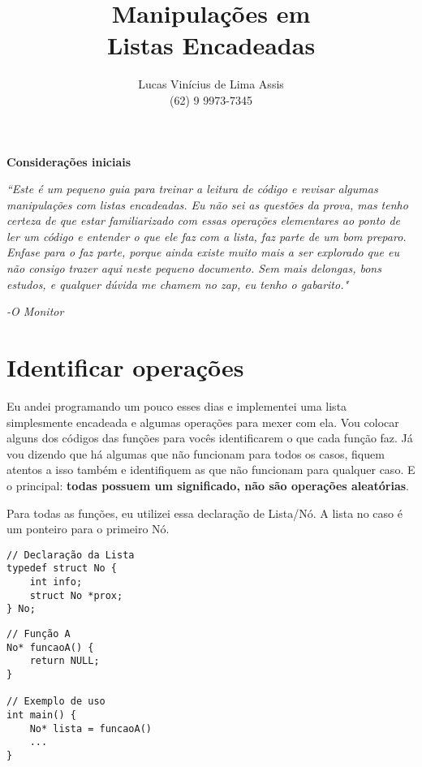 \documentclass[a4paper]{article}
\author{Lucas Vinícius de Lima Assis\\ \small{(62) 9 9973-7345}}
\title{Manipulações em \\ Listas Encadeadas }
\begin{document}
    \maketitle
    \begin{center}
        \textbf{Considerações iniciais}
    \end{center}

    \textit{``Este é um pequeno guia para treinar a leitura de código e revisar
        algumas manipulações com listas encadeadas. Eu não sei as questões da
        prova, mas tenho certeza de que estar familiarizado com essas
        operações elementares ao ponto de ler um código e entender o que ele faz
        com a lista, \emph{faz parte} de um bom preparo. Enfase para o \emph{faz
        parte}, porque ainda existe muito mais a ser explorado que eu não consigo
        trazer aqui neste pequeno documento. Sem mais delongas, bons estudos,
        e qualquer dúvida me chamem no zap, eu tenho o gabarito."}
    \begin{flushright}
        \textit{-O Monitor}
    \end{flushright}

    \section*{Identificar operações}

    Eu andei programando um pouco esses dias e implementei uma lista
    simplesmente encadeada e algumas operações para mexer com ela. Vou colocar
    alguns dos códigos das funções para vocês identificarem o que cada função
    faz. Já vou dizendo que há algumas que não funcionam para todos os casos,
    fiquem atentos a isso também e identifiquem as que não funcionam para
    qualquer caso. E o principal: \textbf{todas possuem um
    significado, não são operações aleatórias}.

    Para todas as funções, eu utilizei essa declaração de Lista/Nó. A lista no
    caso é um ponteiro para o primeiro Nó.

\begin{tcolorbox}
    \begin{verbatim}
// Declaração da Lista
typedef struct No {
    int info;
    struct No *prox;
} No;
    \end{verbatim}
\end{tcolorbox}


\begin{tcolorbox}
    \begin{verbatim}
// Função A
No* funcaoA() {
    return NULL;
}

// Exemplo de uso
int main() {
    No* lista = funcaoA()
    ...
}
    \end{verbatim}
\end{tcolorbox}
\end{document}
